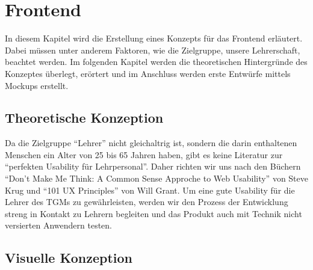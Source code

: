 \section{Frontend}
\label{chapter:konzept-frontend}
In diesem Kapitel wird die Erstellung eines Konzepts für das Frontend erläutert. Dabei müssen unter anderem Faktoren, wie die Zielgruppe, unsere Lehrerschaft, beachtet werden. Im folgenden Kapitel werden die theoretischen Hintergründe des Konzeptes überlegt, erörtert und im Anschluss werden erste Entwürfe mittels Mockups erstellt. 
\subsection{Theoretische Konzeption}
\label{chapter:konzept-frontend-theorie}
Da die Zielgruppe \enquote{Lehrer} nicht gleichaltrig ist, sondern die darin enthaltenen Menschen ein Alter von 25 bis 65 Jahren haben, gibt es keine Literatur zur \enquote{perfekten Usability für Lehrpersonal}. Daher richten wir uns nach den Büchern \enquote{Don't Make Me Think: A Common Sense Approche to Web Usability} von Steve Krug und  \enquote{101 UX Principles} von Will Grant. Um eine gute Usability für die Lehrer des TGMs zu gewährleisten, werden wir den Prozess der Entwicklung streng in Kontakt zu Lehrern begleiten und das Produkt auch mit Technik nicht versierten Anwendern testen.  
\newpage
\subsection{Visuelle Konzeption}
\label{chapter:konzept-frontend-visuell}
